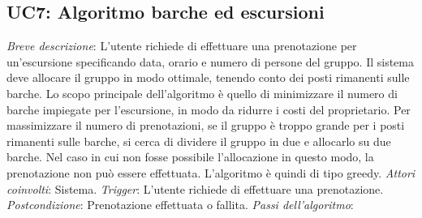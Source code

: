 \clearpage
\subsection{UC7: Algoritmo barche ed escursioni}\label{algoritmo}
 \emph{Breve descrizione}: L'utente richiede di effettuare una prenotazione per un'escursione specificando data, orario e numero di persone del gruppo. Il sistema deve allocare il gruppo in modo ottimale, tenendo conto dei posti rimanenti sulle barche. Lo scopo principale dell'algoritmo è quello di minimizzare il numero di barche impiegate per l'escursione, in modo da ridurre i costi del proprietario. Per massimizzare il numero di prenotazioni, se il gruppo è troppo grande per i posti rimanenti sulle barche, si cerca di dividere il gruppo in due e allocarlo su due barche. Nel caso in cui non fosse possibile l'allocazione in questo modo, la prenotazione non può essere effettuata. L'algoritmo è quindi di tipo greedy. \medbreak
 \emph{Attori coinvolti}: Sistema.\medbreak
 \emph{Trigger}: L'utente richiede di effettuare una prenotazione.\medbreak
 \emph{Postcondizione}: Prenotazione effettuata o fallita.\medbreak
 \emph{Passi dell'algoritmo}:

